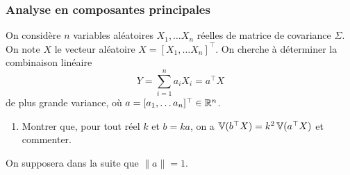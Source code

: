 
\subsubsection{Analyse en composantes principales} 
On considère $n$ variables aléatoires $X_1, \dots X_n$ réelles de matrice de covariance $\Sigma$. On note $X$ le vecteur aléatoire $X = [X_1,  \dots X_n]^\top$. On cherche à déterminer la combinaison linéaire 
$$
Y = \sum_{i=1}^n a_i X_i = a^\top X
$$ 
de plus grande variance, où $a = [a_1, \dots a_n]^\top \in \mathbb{R}^n$.

\begin{enumerate}
  \item Montrer que, pour tout réel $k$ et $b = k a$, on a $\operatorname{\mathbb{V}}(b^\top X) = k^2 \operatorname{\mathbb{V}}(a^\top X)$ et commenter.
\end{enumerate}

\bigskip
\noindent On supposera dans la suite que $\|a\| = 1$.

